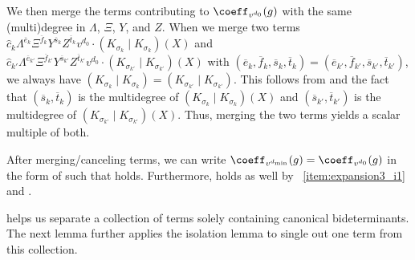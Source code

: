 \documentclass[letterpaper, 11pt]{amsart}
\begin{document}
\begin{pf}
We then merge the terms contributing to $\coeff_{v^{d_0}}(g)$ with the same (multi)degree in $\Lambda$, $\Xi$, $Y$, and $Z$.
When we merge two terms $\widehat{c}_{k} \Lambda^{\overline{e}_k}\Xi^{\overline{f}_k}Y^{\overline{s}_k}Z^{\overline{t}_k}v^{d_0}\cdot (K_{\sigma_k}\mid K_{\sigma_k})(X)$ and $\widehat{c}_{k'} \Lambda^{\overline{e}_{k'}}\Xi^{\overline{f}_{k'}}Y^{\overline{s}_{k'}}Z^{\overline{t}_{k'}}v^{d_0}\cdot (K_{\sigma_{k'}}\mid K_{\sigma_{k'}})(X)$
with $(\overline{e}_k,\overline{f}_k,\overline{s}_k,\overline{t}_k)=(\overline{e}_{k'},\overline{f}_{k'},\overline{s}_{k'},\overline{t}_{k'})$,
we always have $(K_{\sigma_{k}}\mid K_{\sigma_{k}})=(K_{\sigma_{k'}}\mid K_{\sigma_{k'}})$.
This follows from  and the fact that $(\overline{s}_{k},\overline{t}_{k})$ is the multidegree of $(K_{\sigma_{k}}\mid K_{\sigma_{k}})(X)$ and $(\overline{s}_{k'},\overline{t}_{k'})$ is the multidegree of $(K_{\sigma_{k'}}\mid K_{\sigma_{k'}})(X)$.
Thus, merging the two terms yields a scalar multiple of both.

After merging/canceling terms, we can write $\coeff_{v^{d_{\min}}}(g)=\coeff_{v^{d_0}}(g)$ in the form of  such that  holds.
Furthermore,  holds as well by ~\eqref{item:expansion3_i1} and .
\end{pf}

 helps us separate a collection of terms solely containing canonical bideterminants.
The next lemma further applies the isolation lemma to single out one term from this collection.
\end{document}
